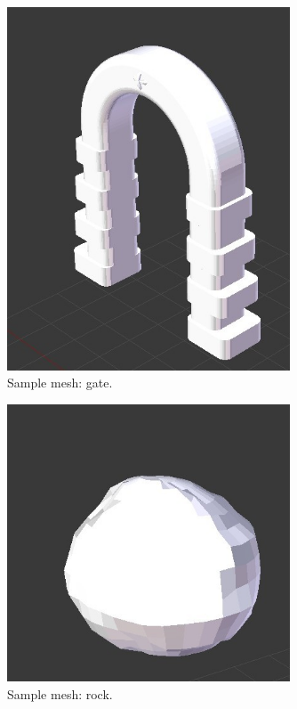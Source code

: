 \documentclass[12pt, titlepage]{article}
\begin{document}
\begin{figure}[hB]
\begin{center}
\includegraphics[width=0.75\textwidth]{door}
\caption{Sample mesh:  gate.} \label{fig:door}
\end{center}
\end{figure}

\begin{figure}[hB]
\begin{center}
\includegraphics[width=0.75\textwidth]{rock}
\caption{Sample mesh:  rock.} \label{fig:rock}
\end{center}
\end{figure}
\end{document}

